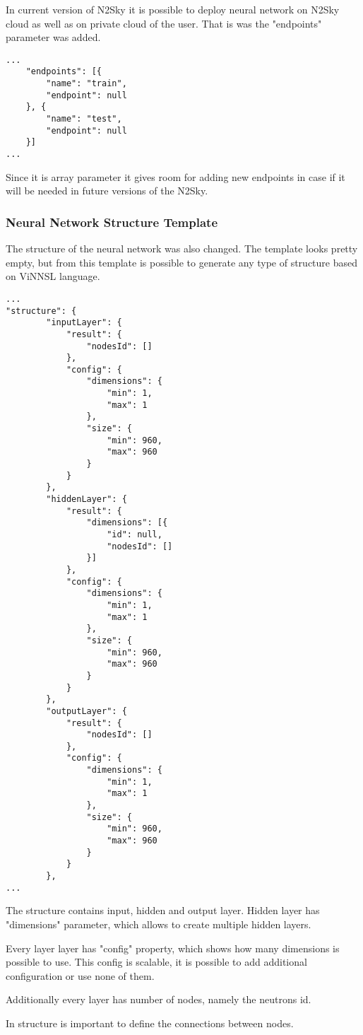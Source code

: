 In current version of N2Sky it is possible to deploy neural network on N2Sky cloud as well as on private cloud of the user. That is was the "endpoints" parameter was added.

\begin{lstlisting}
...
	"endpoints": [{
		"name": "train",
		"endpoint": null
	}, {
		"name": "test",
		"endpoint": null
	}]
...
\end{lstlisting}

Since it is array parameter it gives room for adding new endpoints in case if it will be needed in future versions of the N2Sky.

\subsubsection{Neural Network Structure Template}\label{Neural Network Structure Template}

The structure of the neural network was also changed. The template looks pretty empty, but from this template is possible to generate any type of structure based on ViNNSL language. 

\begin{lstlisting}
...
"structure": {
		"inputLayer": {
			"result": {
				"nodesId": []
			},
			"config": {
				"dimensions": {
					"min": 1,
					"max": 1
				},
				"size": {
					"min": 960,
					"max": 960
				}
			}
		},
		"hiddenLayer": {
			"result": {
				"dimensions": [{
					"id": null,
					"nodesId": []
				}]
			},
			"config": {
				"dimensions": {
					"min": 1,
					"max": 1
				},
				"size": {
					"min": 960,
					"max": 960
				}
			}
		},
		"outputLayer": {
			"result": {
				"nodesId": []
			},
			"config": {
				"dimensions": {
					"min": 1,
					"max": 1
				},
				"size": {
					"min": 960,
					"max": 960
				}
			}
		},
...
\end{lstlisting}

The structure contains input, hidden and output layer. Hidden layer has "dimensions" parameter, which allows to create multiple hidden layers.

 Every layer layer has "config" property, which shows how many dimensions is possible to use. This config is scalable, it is possible to add additional configuration or use none of them.
 
 Additionally every layer has number of nodes, namely the neutrons id.  
 
 In structure is important to define the connections between nodes. 
 
